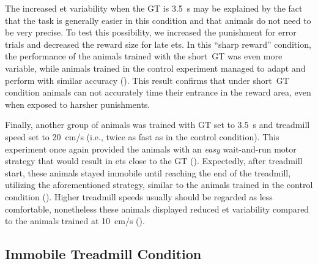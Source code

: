 The increased \gls{et} variability when the GT is 3.5~s may be explained by the fact that the task is generally easier in this condition and that animals do not need to be very precise.
To test this possibility, we increased the punishment for error trials and decreased the reward size for late \glspl{et}.
In this ``sharp reward'' condition, the performance of the animals trained with the short~GT was even more variable, while animals trained in the control experiment managed to adapt and perform with similar accuracy ().
This result confirms that under short~GT condition animals can not accurately time their entrance in the reward area, even when exposed to harsher punishments.
\par
Finally, another group of animals was trained with GT set to 3.5~s and treadmill speed set to 20~cm/s (i.e., twice as fast as in the control condition).
This experiment once again provided the animals with an \textit{easy} wait-and-run motor strategy that would result in \glspl{et} close to the GT ().
Expectedly, after treadmill start, these animals stayed immobile until reaching the end of the treadmill, utilizing the aforementioned strategy, similar to the animals trained in the control condition ().
Higher treadmill speeds usually should be regarded as less comfortable, nonetheless these animals displayed reduced \gls{et} variability compared to the animals trained at 10~cm/s ().


\subsection[Immobile Condition]{Immobile Treadmill Condition}
\label{ch:time:immobile}


